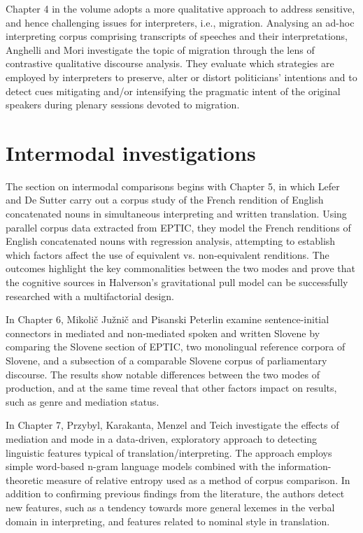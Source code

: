 \documentclass[output=paper]{langscibook}
\begin{document}
Chapter 4 in the volume adopts a more qualitative approach to address sensitive, and hence challenging issues for interpreters, i.e., migration. Analysing an ad-hoc interpreting corpus comprising transcripts of speeches and their interpretations, Anghelli and Mori investigate the topic of migration through the lens of contrastive qualitative discourse analysis. They evaluate which strategies are employed by interpreters to preserve, alter or distort politicians’ intentions and to detect cues mitigating and/or intensifying the pragmatic intent of the original speakers during plenary sessions devoted to migration.

\section{Intermodal investigations}

The section on intermodal comparisons begins with Chapter 5, in which Lefer and De Sutter carry out a corpus study of the French rendition of English concatenated nouns in simultaneous interpreting and written translation. Using parallel corpus data extracted from EPTIC, they model the French renditions of English concatenated nouns with regression analysis, attempting to establish which factors affect the use of equivalent vs. non-equivalent renditions. The outcomes highlight the key commonalities between the two modes and prove that the cognitive sources in Halverson’s gravitational pull model can be successfully researched with a multifactorial design.

In Chapter 6, Mikolič Južnič and Pisanski Peterlin examine sentence-initial connectors in mediated and non-mediated spoken and written Slovene by comparing the Slovene section of EPTIC, two monolingual reference corpora of Slovene, and a subsection of a comparable Slovene corpus of parliamentary discourse. The results show notable differences between the two modes of production, and at the same time reveal that other factors impact on results, such as genre and mediation status.

In Chapter 7, Przybyl, Karakanta, Menzel and Teich investigate the effects of mediation and mode in a data-driven, exploratory approach to detecting linguistic features typical of translation/interpreting. The approach employs simple word-based n-gram language models combined with the information-theoretic measure of relative entropy used as a method of corpus comparison. In addition to confirming previous findings from the literature, the authors detect new features, such as a tendency towards more general lexemes in the verbal domain in interpreting, and features related to nominal style in translation.
\end{document}
